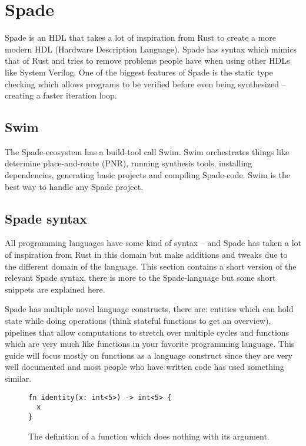 \section{Spade}
Spade is an HDL that takes a lot of inspiration from Rust to create a more modern HDL (Hardware Description Language). Spade has syntax which mimics that of Rust and tries to remove problems people have when using other HDLs like System Verilog. One of the biggest features of Spade is the static type checking which allows programs to be verified before even being synthesized -- creating a faster iteration loop.
\cite{src:spadeSomething,src:spadeAnHDL}

\subsection{Swim}
The Spade-ecosystem has a build-tool call Swim. Swim orchestrates things like determine place-and-route (PNR), running synthesis tools, installing dependencies, generating basic projects and compiling Spade-code. Swim is the best way to handle any Spade project.

\subsection{Spade syntax}
All programming languages have some kind of syntax -- and Spade has taken a lot of inspiration from Rust in this domain but make additions and tweaks due to the different domain of the language. This section contains a short version of the relevant Spade syntax, there is more to the Spade-language but some short snippets are explained here.

Spade has multiple novel language constructs, there are: entities which can hold state while doing operations (think stateful functions to get an overview), pipelines that allow computations to stretch over multiple cycles and functions which are very much like functions in your favorite programming language. This guide will focus mostly on functions as a language construct since they are very well documented and most people who have written code has used something similar.

\begin{figure}[h!]
\begin{verbatim}
fn identity(x: int<5>) -> int<5> {
  x
}
\end{verbatim}
  \caption{The definition of a function which does nothing with its argument.}
  \label{fig:SpadeExample1}
\end{figure}


